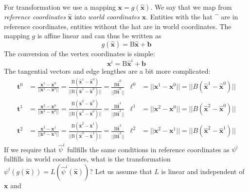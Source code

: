 \documentclass{scrartcl}
\begin{document}
For transformation we use a mapping $\mathbf x=g(\mathbf{\hat x})$.  We say
that we map from {\em reference coordinates} $\mathbf{\hat x}$ into {\em world
  coordinates} $\mathbf x$.  Entities with the hat $\hat{\phantom x}$ are in
reference coordinates, entities without the hat are in world coordinates.  The
mapping $g$ is affine linear and can thus be written as
\begin{equation}
  g(\mathbf{\hat x})=\mathrm B\mathbf{\hat x}+\mathbf b
\end{equation}
The conversion of the vertex coordinates is simple:
\begin{equation}
  \mathbf x^i=\mathrm B\mathbf{\hat x}^i+\mathbf b
\end{equation}
The tangential vectors and edge lengthes are a bit more complicated:
\begin{subequations}
  \begin{align}
    \mathbf t^0&
      =\frac{\mathbf x^1-\mathbf x^0}{||\mathbf x^1-\mathbf x^0||}
      =\frac{\mathrm B(\mathbf{\hat x}^1-\mathbf{\hat x}^0)}
            {||\mathrm B(\mathbf{\hat x}^1-\mathbf{\hat x}^0)||}
      =\frac{\mathrm B\mathbf{\hat t}^0}{||\mathrm B\mathbf{\hat t}^0||}
    &  \ell^0&=||\mathbf x^1-\mathbf x^0||
              =||B(\mathbf{\hat x}^1-\mathbf{\hat x}^0)||               \\
    \mathbf t^1&
      =\frac{\mathbf x^2-\mathbf x^0}{||\mathbf x^2-\mathbf x^0||}
      =\frac{\mathrm B(\mathbf{\hat x}^2-\mathbf{\hat x}^0)}
            {||\mathrm B(\mathbf{\hat x}^2-\mathbf{\hat x}^0)||}
      =\frac{\mathrm B\mathbf{\hat t}^1}{||\mathrm B\mathbf{\hat t}^1||}
    &  \ell^1&=||\mathbf x^2-\mathbf x^0||
              =||B(\mathbf{\hat x}^2-\mathbf{\hat x}^0)||               \\
    \mathbf t^2&
      =\frac{\mathbf x^2-\mathbf x^1}{||\mathbf x^2-\mathbf x^1||}
      =\frac{\mathrm B(\mathbf{\hat x}^2-\mathbf{\hat x}^1)}
            {||\mathrm B(\mathbf{\hat x}^2-\mathbf{\hat x}^1)||}
      =\frac{\mathrm B\mathbf{\hat t}^2}{||\mathrm B\mathbf{\hat t}^2||}
    &  \ell^2&=||\mathbf x^2-\mathbf x^1||
              =||B(\mathbf{\hat x}^2-\mathbf{\hat x}^1)||
  \end{align}
\end{subequations}
If we require that $\hat\psi^i$ fullfills the same conditions in reference
coordinates as $\psi^i$ fullfills in world coordinates, what is the
transformation $\psi^i(g(\mathbf{\hat x}))=L(\hat\psi^i(\mathbf{\hat x}))$?
Let us assume that $L$ is linear and independent of $\mathbf x$ and
\end{document}
